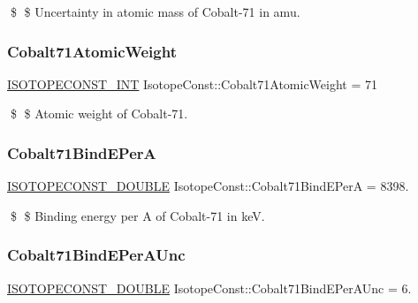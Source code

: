 \$ \$ Uncertainty in atomic mass of Cobalt-\/71 in amu. \mbox{\label{group___isotope_const-_cobalt-_co71_gadcdd6de49d5b9e2c7cfe45afe008e914}} 
\subsubsection{\texorpdfstring{Cobalt71\+Atomic\+Weight}{Cobalt71AtomicWeight}}
{\footnotesize\ttfamily \mbox{\hyperlink{group___isotope_const-_macros_ga5f18360b3e99483a35c32d789e62621c}{I\+S\+O\+T\+O\+P\+E\+C\+O\+N\+S\+T\+\_\+\+I\+NT}} Isotope\+Const\+::\+Cobalt71\+Atomic\+Weight = 71}

\$ \$ Atomic weight of Cobalt-\/71. \mbox{\label{group___isotope_const-_cobalt-_co71_ga6de2b699f4d2cbf75cba175632ae37de}} 
\subsubsection{\texorpdfstring{Cobalt71\+Bind\+E\+PerA}{Cobalt71BindEPerA}}
{\footnotesize\ttfamily \mbox{\hyperlink{group___isotope_const-_macros_ga8f45a7272ce02c0b4c65c44636ed719a}{I\+S\+O\+T\+O\+P\+E\+C\+O\+N\+S\+T\+\_\+\+D\+O\+U\+B\+LE}} Isotope\+Const\+::\+Cobalt71\+Bind\+E\+PerA = 8398.}

\$ \$ Binding energy per A of Cobalt-\/71 in keV. \mbox{\label{group___isotope_const-_cobalt-_co71_gae9b38ccbc99ccd9f4f916ad882a2605b}} 
\subsubsection{\texorpdfstring{Cobalt71\+Bind\+E\+Per\+A\+Unc}{Cobalt71BindEPerAUnc}}
{\footnotesize\ttfamily \mbox{\hyperlink{group___isotope_const-_macros_ga8f45a7272ce02c0b4c65c44636ed719a}{I\+S\+O\+T\+O\+P\+E\+C\+O\+N\+S\+T\+\_\+\+D\+O\+U\+B\+LE}} Isotope\+Const\+::\+Cobalt71\+Bind\+E\+Per\+A\+Unc = 6.}

